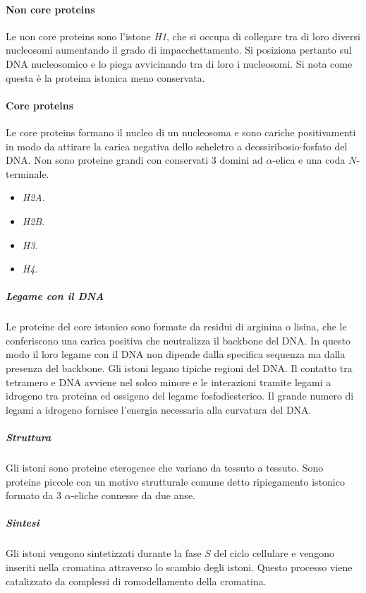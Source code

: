 			\paragraph{Non core proteins}
			Le non core proteins sono l'istone \emph{H1}, che si occupa di collegare tra di loro diversi nucleosomi aumentando il grado di impacchettamento.
			Si posiziona pertanto sul DNA nucleosomico e lo piega avvicinando tra di loro i nucleosomi.
			Si nota come questa \`e la proteina istonica meno conservata.

			\paragraph{Core proteins}
			Le core proteins formano il nucleo di un nucleosoma e sono cariche positivamenti in modo da attirare la carica negativa dello scheletro a deossiribosio-fosfato del DNA.
			Non sono proteine grandi con conservati $3$ domini ad $\alpha$-elica e una coda $N$-terminale.
			\begin{multicols}{4}
				\begin{itemize}
					\item \emph{H2A}.
					\item \emph{H2B}.
					\item \emph{H3}.
					\item \emph{H4}.
				\end{itemize}
			\end{multicols}
			
				\subparagraph{Legame con il DNA}
				Le proteine del core istonico sono formate da residui di arginina o lisina, che le conferiscono una carica positiva che neutralizza il backbone del DNA.
				In questo modo il loro legame con il DNA non dipende dalla specifica sequenza ma dalla presenza del backbone.
				Gli istoni legano tipiche regioni del DNA.
				Il contatto tra tetramero e DNA avviene nel solco minore e le interazioni tramite legami a idrogeno tra proteina ed ossigeno del legame fosfodiesterico.
				Il grande numero di legami a idrogeno fornisce l'energia necessaria alla curvatura del DNA.

				\subparagraph{Struttura}
				Gli istoni sono proteine eterogenee che variano da tessuto a tessuto.
				Sono proteine piccole con un motivo strutturale comune detto ripiegamento istonico formato da $3$ $\alpha$-eliche connesse da due anse.

				\subparagraph{Sintesi}
				Gli istoni vengono sintetizzati durante la fase $S$ del ciclo cellulare e vengono inseriti nella cromatina attraverso lo scambio degli istoni.
				Questo processo viene catalizzato da complessi di romodellamento della cromatina.
				
